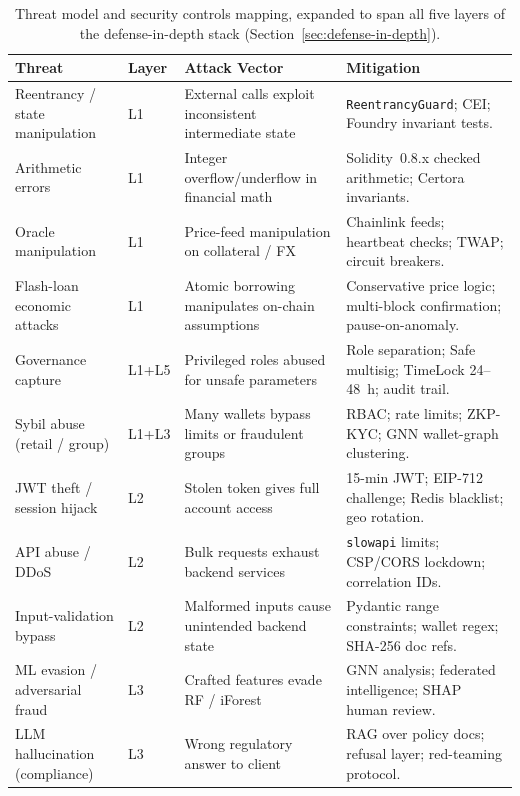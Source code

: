 \documentclass[12pt,a4paper]{report}
\newcommand{\tableheadcolor}{\rowcolor{TableHeadBg}}
\newcommand{\tableheadfont}{\bfseries}
\begin{document}
\begin{table}[H]
\centering
\caption[Threat model and security controls mapping]{Threat model and security controls mapping, expanded to span all five layers of the defense-in-depth stack (Section~\ref{sec:defense-in-depth}).}
\label{tab:threat-model}
\footnotesize
\setlength{\tabcolsep}{4pt}
\begin{tabular}{@{}p{2.3cm}p{1.1cm}p{3.6cm}p{5.8cm}@{}}
\toprule
\tableheadcolor
\tableheadfont Threat & \tableheadfont Layer & \tableheadfont Attack Vector & \tableheadfont Mitigation \\
\midrule
Reentrancy / state manipulation & L1 & External calls exploit inconsistent intermediate state & \texttt{ReentrancyGuard}; CEI; Foundry invariant tests. \\
\rowcolor{RowShade}
Arithmetic errors & L1 & Integer overflow/underflow in financial math & Solidity~0.8.x checked arithmetic; Certora invariants. \\
Oracle manipulation & L1 & Price-feed manipulation on collateral / FX & Chainlink feeds; heartbeat checks; TWAP; circuit breakers. \\
\rowcolor{RowShade}
Flash-loan economic attacks & L1 & Atomic borrowing manipulates on-chain assumptions & Conservative price logic; multi-block confirmation; pause-on-anomaly. \\
Governance capture & L1+L5 & Privileged roles abused for unsafe parameters & Role separation; Safe multisig; TimeLock 24--48~h; audit trail. \\
\rowcolor{RowShade}
Sybil abuse (retail / group) & L1+L3 & Many wallets bypass limits or fraudulent groups & RBAC; rate limits; ZKP-KYC; GNN wallet-graph clustering. \\
JWT theft / session hijack & L2 & Stolen token gives full account access & 15-min JWT; EIP-712 challenge; Redis blacklist; geo rotation. \\
\rowcolor{RowShade}
API abuse / DDoS & L2 & Bulk requests exhaust backend services & \texttt{slowapi} limits; CSP/CORS lockdown; correlation IDs. \\
Input-validation bypass & L2 & Malformed inputs cause unintended backend state & Pydantic range constraints; wallet regex; SHA-256 doc refs. \\
\rowcolor{RowShade}
ML evasion / adversarial fraud & L3 & Crafted features evade RF / iForest & GNN analysis; federated intelligence; SHAP human review. \\
LLM hallucination (compliance) & L3 & Wrong regulatory answer to client & RAG over policy docs; refusal layer; red-teaming protocol. \\

\end{tabular}
\end{table}
\end{document}
